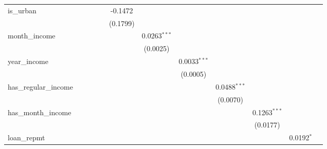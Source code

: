 \begin{table}[htbp]
\begin{tiny}
\begin{tabular}{lccccccccccc}
         is\_urban             &                &                &                &                & -0.1472        &                &                &                &                &                &   \\
                                &                &                &                &                & (0.1799)       &                &                &                &                &                &   \\
         month\_income         &                &                &                &                &                & 0.0263$^{***}$ &                &                &                &                &   \\
                                &                &                &                &                &                & (0.0025)       &                &                &                &                &   \\
         year\_income          &                &                &                &                &                &                & 0.0033$^{***}$ &                &                &                &   \\
                                &                &                &                &                &                &                & (0.0005)       &                &                &                &   \\
         has\_regular\_income &                &                &                &                &                &                &                & 0.0488$^{***}$ &                &                &   \\
                                &                &                &                &                &                &                &                & (0.0070)       &                &                &   \\
         has\_month\_income   &                &                &                &                &                &                &                &                & 0.1263$^{***}$ &                &   \\
                                &                &                &                &                &                &                &                &                & (0.0177)       &                &   \\
         loan\_repmt           &                &                &                &                &                &                &                &                &                & 0.0192$^{*}$   &   \\

\end{tabular}
\end{tiny}
\end{table}
